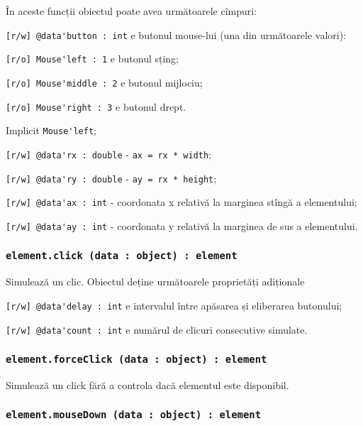 În aceste funcții obiectul  poate avea următoarele cîmpuri:
\begin{icItems}
	\item \lstinline|[r/w] @data'button : int| e butonul mouse-lui (una din următoarele valori):
	\begin{icItems}
		\item \lstinline|[r/o] Mouse'left : 1| e butonul sțing;
		\item \lstinline|[r/o] Mouse'middle : 2| e butonul mijlociu;
		\item \lstinline|[r/o] Mouse'right : 3| e butonul drept.
	\end{icItems}
	Implicit \lstinline|Mouse'left|;
	\item \lstinline|[r/w] @data'rx : double| - \lstinline|ax = rx * width|;
	\item \lstinline|[r/w] @data'ry : double| - \lstinline|ay = rx * height|;
	\item \lstinline|[r/w] @data'ax : int| - coordonata x relativă la marginea stîngă a elementului;
	\item \lstinline|[r/w] @data'ay : int| - coordonata y relativă la marginea de sus a elementului.
\end{icItems}

\subsubsection{\lstinline|element.click (data : object) : element|}

Simulează un clic. Obiectul  deține următoarele proprietăți adiționale
\begin{icItems}
	\item \lstinline|[r/w] @data'delay : int| e intervalul între apăsarea și eliberarea butonului;
	\item \lstinline|[r/w] @data'count : int| e numărul de clicuri consecutive simulate.
\end{icItems}

\subsubsection{\lstinline|element.forceClick (data : object) : element|}

Simulează un click fără a controla dacă elementul este disponibil.

\subsubsection{\lstinline|element.mouseDown (data : object) : element|}

